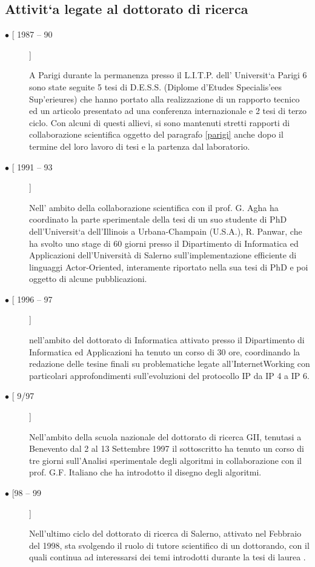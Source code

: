\documentclass[11pt]{article}
\newlength{\boxsize}
\begin{document}
\subsection{Attivit\a`a legate al dottorato di ricerca}
\begin{description}
\item [$ \bullet $ [ 1987 -- 90]] \hfill \parbox[t]{\boxsize} { A
Parigi durante la permanenza presso il L.I.T.P.  dell' Universit\a`a
Parigi 6 sono state seguite 5 tesi di D.E.S.S. (Diplome d'Etudes
Specialis\a'ees Sup\a'erieures) che hanno portato alla realizzazione
di un rapporto tecnico ed un articolo presentato ad una conferenza
internazionale \cite{ISCIS:1,litp:2} e 2 tesi di terzo ciclo.  Con
alcuni di questi allievi, si sono mantenuti stretti rapporti di
collaborazione scientifica oggetto del paragrafo \ref{parigi} anche
dopo il termine del loro lavoro di tesi e la partenza dal
laboratorio.
}

\item [$ \bullet $ [ 1991 -- 93]] \hfill \parbox[t]{\boxsize} { Nell'
ambito della collaborazione scientifica con il prof. G. Agha ha
coordinato la parte sperimentale della tesi di un suo studente di PhD
dell'Universit\a`a dell'Illinois a Urbana-Champain (U.S.A.),
R. Panwar, che ha svolto uno stage di 60 giorni presso il Dipartimento
di Informatica ed Applicazioni dell'Universit\`a di Salerno
sull'implementazione efficiente di linguaggi Actor-Oriented,
interamente riportato nella sua tesi di PhD e poi oggetto di alcune
pubblicazioni.
}

\item [$ \bullet $ [ 1996 -- 97]] \hfill \parbox[t]{\boxsize}
{nell'ambito del dottorato di Informatica attivato presso il Dipartimento di
Informatica ed Applicazioni ha tenuto un corso di 30 ore, coordinando la
redazione delle tesine finali su problematiche legate
all'InternetWorking con particolari approfondimenti sull'evoluzioni
del protocollo IP da IP 4 a IP 6.
}

\item [$ \bullet $ [ 9/97]] \hfill \parbox[t]{\boxsize}{ Nell'ambito
della scuola nazionale del dottorato di ricerca GII, tenutasi a
Benevento dal 2 al 13 Settembre 1997 il sottoscritto ha tenuto un
corso di tre giorni sull'Analisi sperimentale degli algoritmi in
collaborazione con il prof. G.F. Italiano che ha introdotto il disegno
degli algoritmi. 
}

\item [$ \bullet $ [98 -- 99]] \hfill \parbox[t]{\boxsize}{
Nell'ultimo ciclo del dottorato di ricerca di Salerno, attivato nel
Febbraio del 1998, sta svolgendo il ruolo di tutore scientifico di un
dottorando, con il quali continua ad interessarsi dei temi introdotti
durante la tesi di laurea \cite{IFIP:98}.
}

\end{description}
\end{document}
